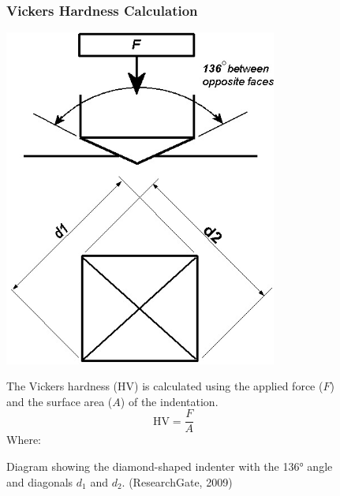 \documentclass{article}
\begin{document}
    \begin{figure}[H]
        \centering
        \begin{minipage}{0.45\textwidth}
            \vspace{-1em}
            \subsubsection{Vickers Hardness Calculation}\label{VHC}
            
            \centering
            \vspace{2em}\includegraphics[width=0.8\textwidth]{figures/3537580_orig-0000.jpg}
            \caption{Diagram showing the diamond-shaped indenter with the 136° angle and diagonals \(d_1\) and \(d_2\). (ResearchGate, 2009)}
            \label{fig:vickers-diagram}
        \end{minipage}\hfill
        \begin{minipage}{0.51\textwidth}
            The Vickers hardness (HV) is calculated using the applied force (\(F\)) and the surface area (\(A\)) of the indentation. 
            \begin{equation}
                \text{HV} = \frac{F}{A}
            \end{equation}
            Where:
            \begin{itemize}[itemsep=-1mm]

\end{itemize}
\end{minipage}
\end{figure}
\end{document}
